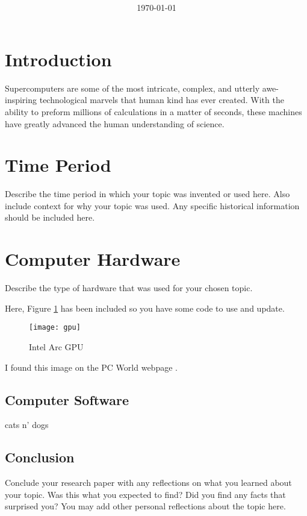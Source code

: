 \documentclass[11pt, twocolumn]{article}
\title{{\large } \thetitle}
\author{\theauthor}
\date{\today}
\begin{document}
\maketitle

\thispagestyle{firstpage}

\section{Introduction}
Supercomputers are some of the most intricate, complex, and utterly awe-inspiring technological marvels that human kind has ever created. With the ability to preform millions of calculations in a matter of seconds, these machines have greatly advanced the human understanding of science.

\section{Time Period}
Describe the time period in which your topic was invented or used here. Also include
context for why your topic was used. Any specific historical information should be 
included here.

\section{Computer Hardware}
Describe the type of hardware that was used for your chosen topic.

Here, Figure \ref{fig:gpu} has been included so you have some code to use and update.
\begin{figure}
    \centering
    \texttt{[image: gpu]}
    \caption{Intel Arc GPU}
    \label{fig:gpu}
\end{figure}

I found this image on the PC World webpage \cite{Ung21}. 

\subsection{Computer Software}
cats n' dogs

\subsection{Conclusion}
Conclude your research paper with any reflections on what you learned about your 
topic. Was this what you expected to find? Did you find any facts that surprised you?
You may add other personal reflections about the topic here.



\end{document}
